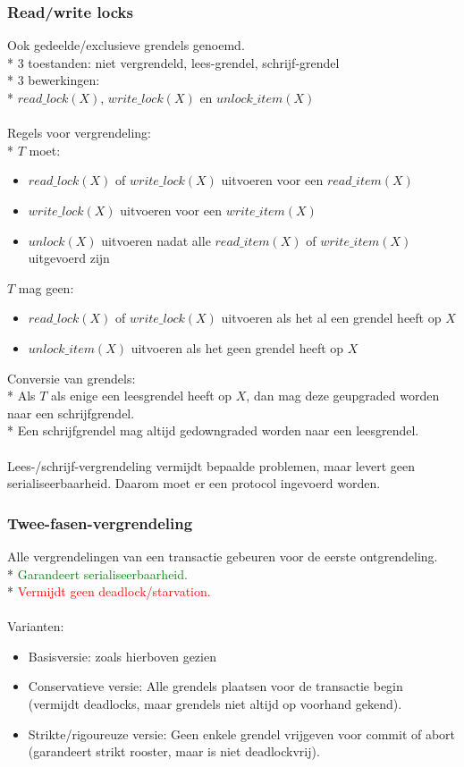 \documentclass[10pt]{article}
\begin{document}
\subsubsection{Read/write locks}
Ook gedeelde/exclusieve grendels genoemd.\\*
3 toestanden: niet vergrendeld, lees-grendel, schrijf-grendel\\*
3 bewerkingen:\\*
$read\_lock(X)$, $write\_lock(X)$ en $unlock\_item(X)$\\\\
Regels voor vergrendeling:\\*
$T$ moet:
\begin{itemize}
\item $read\_lock(X)$ of $write\_lock(X)$ uitvoeren voor een $read\_item(X)$
\item $write\_lock(X)$ uitvoeren voor een $write\_item(X)$
\item $unlock(X)$ uitvoeren nadat alle $read\_item(X)$ of $write\_item(X)$ uitgevoerd zijn
\end{itemize}
$T$ mag geen:
\begin{itemize}
\item $read\_lock(X)$ of $write\_lock(X)$ uitvoeren als het al een grendel heeft op $X$
\item $unlock\_item(X)$ uitvoeren als het geen grendel heeft op $X$
\end{itemize}
Conversie van grendels:\\*
Als $T$ als enige een leesgrendel heeft op $X$, dan mag deze geupgraded worden naar een schrijfgrendel.\\*
Een schrijfgrendel mag altijd gedowngraded worden naar een leesgrendel.\\\\
Lees-/schrijf-vergrendeling vermijdt bepaalde problemen, maar levert geen serialiseerbaarheid. Daarom moet er een protocol ingevoerd worden.
\subsubsection{Twee-fasen-vergrendeling}
Alle vergrendelingen van een transactie gebeuren voor de eerste ontgrendeling.\\*
\textcolor{green}{Garandeert serialiseerbaarheid.}\\*
\textcolor{red}{Vermijdt geen deadlock/starvation.}\\\\
Varianten:
\begin{itemize}
\item Basisversie: zoals hierboven gezien
\item Conservatieve versie: Alle grendels plaatsen voor de transactie begin (vermijdt deadlocks, maar grendels niet altijd op voorhand gekend).
\item Strikte/rigoureuze versie: Geen enkele grendel vrijgeven voor commit of abort (garandeert strikt rooster, maar is niet deadlockvrij).
\end{itemize}
\end{document}

